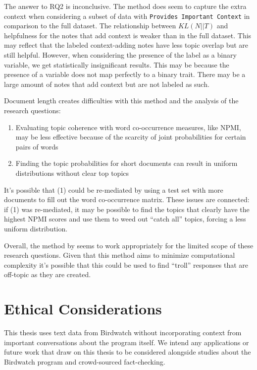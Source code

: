 \documentclass [11pt, proquest] {uwthesis}[2020/02/24]
\begin{document}
The answer to RQ2 is inconclusive. The method does seem to capture the extra context when considering a subset of data with \verb|Provides Important Context| in comparison to the full dataset. The relationship between $KL(N || T)$ and helpfulness for the notes that add context is weaker than in the full dataset. This may reflect that the labeled context-adding notes have less topic overlap but are still helpful. However, when considering the presence of the label as a binary variable, we get statistically insignificant results. This may be because the presence of a variable does not map perfectly to a binary trait. There may be a large amount of notes that add context but are not labeled as such.

Document length creates difficulties with this method and the analysis of the research questions:

\begin{enumerate}
    \item Evaluating topic coherence with word co-occurrence measures, like NPMI, may be less effective because of the scarcity of joint probabilities for certain pairs of words
    \item Finding the topic probabilities for short documents can result in uniform distributions without clear top topics
\end{enumerate}

It’s possible that (1) could be re-mediated by using a test set with more documents to fill out the word co-occurrence matrix. These issues are connected: if (1) was re-mediated, it may be possible to find the topics that clearly have the highest NPMI scores and use them to weed out “catch all” topics, forcing a less uniform distribution.

Overall, the method by \cite{sia-etal-2020-tired} seems to work appropriately for the limited scope of these research questions. Given that this method aims to minimize computational complexity it’s possible that this could be used to find “troll” responses that are off-topic as they are created.

\chapter{Ethical Considerations}\label{ethicalconsiderations}

This thesis uses text data from Birdwatch without incorporating context from important conversations about the program itself. We intend any applications or future work that draw on this thesis to be considered alongside studies about the Birdwatch program and crowd-sourced fact-checking.
\end{document}
